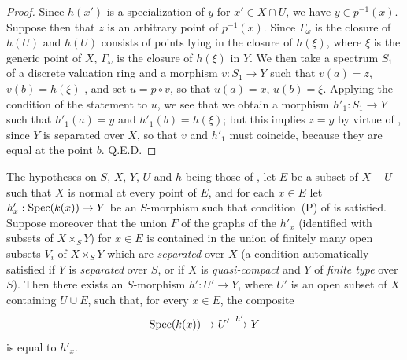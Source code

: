 \begin{proof}
Since $h(x')$ is a specialization of $y$ for $x'\in X\cap U$, we have $y\in p^{-1}(x)$.
Suppose then that $z$ is an arbitrary point of $p^{-1}(x)$.
Since $\Gamma_\omega$ is the closure of $h(U)$ and $h(U)$ consists of points lying in the closure of $h(\xi)$, where $\xi$ is the generic point of $X$, $\Gamma_\omega$ is the closure of $h(\xi)$ in $Y$.
We then take a spectrum $S_1$ of a discrete valuation ring and a morphism $v:S_1\to Y$ such that $v(a)=z$, $v(b)=h(\xi)$ , and set $u=p\circ v$, so that $u(a)=x$, $u(b)=\xi$.
Applying the condition of the statement to $u$, we see that we obtain a morphism $h'_1:S_1\to Y$ such that $h'_1(a)=y$ and $h'_1(b)=h(\xi)$; but this implies $z=y$ by virtue of , since $Y$ is separated over $X$, so that $v$ and $h'_1$ must coincide, because they are equal at the point $b$.
Q.E.D.
\end{proof}

\begin{corollary}[20.4.7]\label{IV.20.4.7}
The hypotheses on $S$, $X$, $Y$, $U$ and $h$ being those of , let $E$ be a subset of $X-U$ such that $X$ is normal at every point of $E$, and for each $x\in E$ let $h'_x:\operatorname{Spec}(k(x))\to Y$ be an $S$-morphism such that condition~(P) of  is satisfied.
Suppose moreover that the union $F$ of the graphs of the $h'_x$ (identified with subsets of $X\times_S Y$) for $x\in E$ is contained in the union of finitely many open subsets $V_i$ of $X\times_S Y$ which are \emph{separated} over $X$ (a condition automatically satisfied if $Y$ is \emph{separated} over $S$, or if $X$ is \emph{quasi-compact} and $Y$ of \emph{finite type} over $S$).
Then there exists an $S$-morphism $h':U'\to Y$, where $U'$ is an open subset of $X$ containing $U\cup E$, such that, for every $x\in E$, the composite
\[
  \operatorname{Spec}(k(x))\to U'\xrightarrow{h'}Y
\]
is equal to $h'_x$.
\end{corollary}

